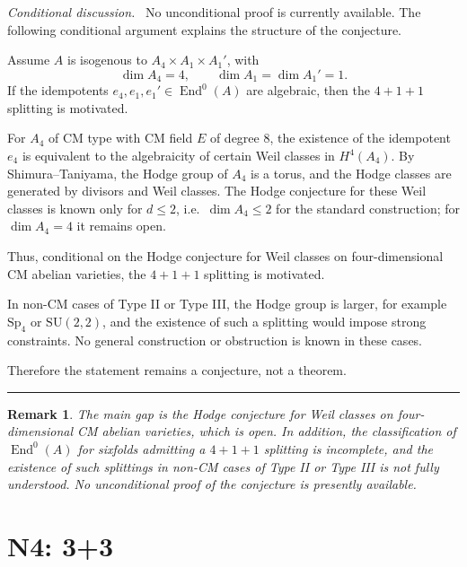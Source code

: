 \documentclass{article}
\newtheorem{remark}{Remark}
\newenvironment{proof}[1][Proof]{\par\noindent\textit{#1.}\ }{\hfill\rule{1.2ex}{1.2ex}\par}
\begin{document}
\begin{proof}[Conditional discussion]
No unconditional proof is currently available. The following conditional argument explains the structure of the conjecture.

Assume \(A\) is isogenous to \(A_4\times A_1\times A_1'\), with
\[
\dim A_4=4,\qquad \dim A_1=\dim A_1'=1.
\]
If the idempotents \(e_4,e_1,e_1'\in \operatorname{End}^0(A)\) are algebraic, then the \(4+1+1\) splitting is motivated.

For \(A_4\) of CM type with CM field \(E\) of degree \(8\), the existence of the idempotent \(e_4\) is equivalent to the algebraicity of certain Weil classes in \(H^4(A_4)\). By Shimura--Taniyama, the Hodge group of \(A_4\) is a torus, and the Hodge classes are generated by divisors and Weil classes. The Hodge conjecture for these Weil classes is known only for \(d\le 2\), i.e.\ \(\dim A_4\le 2\) for the standard construction; for \(\dim A_4=4\) it remains open.

Thus, conditional on the Hodge conjecture for Weil classes on four-dimensional CM abelian varieties, the \(4+1+1\) splitting is motivated.

In non-CM cases of Type II or Type III, the Hodge group is larger, for example \(\mathrm{Sp}_4\) or \(\mathrm{SU}(2,2)\), and the existence of such a splitting would impose strong constraints. No general construction or obstruction is known in these cases.

Therefore the statement remains a conjecture, not a theorem.
\end{proof}

\begin{remark}
The main gap is the Hodge conjecture for Weil classes on four-dimensional CM abelian varieties, which is open. In addition, the classification of \(\operatorname{End}^0(A)\) for sixfolds admitting a \(4+1+1\) splitting is incomplete, and the existence of such splittings in non-CM cases of Type II or Type III is not fully understood. No unconditional proof of the conjecture is presently available.
\end{remark}

\section{N4: 3+3}
\end{document}
